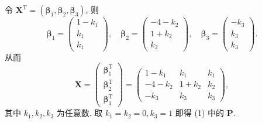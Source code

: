 \documentclass[../../main.tex]{subfiles}
\begin{document}
\begin{solution}
令 $\boldsymbol{X}^\mathrm{T} = \left( \boldsymbol{\beta}_1, \boldsymbol{\beta}_2, \boldsymbol{\beta}_3 \right)$, 则
\[
\boldsymbol{\beta}_1 = \begin{pmatrix} 1 - k_1 \\ k_1 \\ k_1 \end{pmatrix}, \quad \boldsymbol{\beta}_2 = \begin{pmatrix} -4 - k_2 \\ 1 + k_2 \\ k_2 \end{pmatrix}, \quad \boldsymbol{\beta}_3 = \begin{pmatrix} -k_3 \\ k_3 \\ k_3 \end{pmatrix}.
\]
从而
\[
\boldsymbol{X} = \begin{pmatrix} 
\boldsymbol{\beta}_1^\mathrm{T} \\
\boldsymbol{\beta}_2^\mathrm{T} \\
\boldsymbol{\beta}_3^\mathrm{T} 
\end{pmatrix} = \begin{pmatrix} 
1 - k_1 & k_1 & k_1 \\
-4 - k_2 & 1 + k_2 & k_2 \\
-k_3 & k_3 & k_3 
\end{pmatrix},
\]
其中 $k_1, k_2, k_3$ 为任意数.
取 $k_1 = k_2 = 0, k_3 = 1$ 即得 (1) 中的 $\boldsymbol{P}$.
\end{solution}
\end{document}

